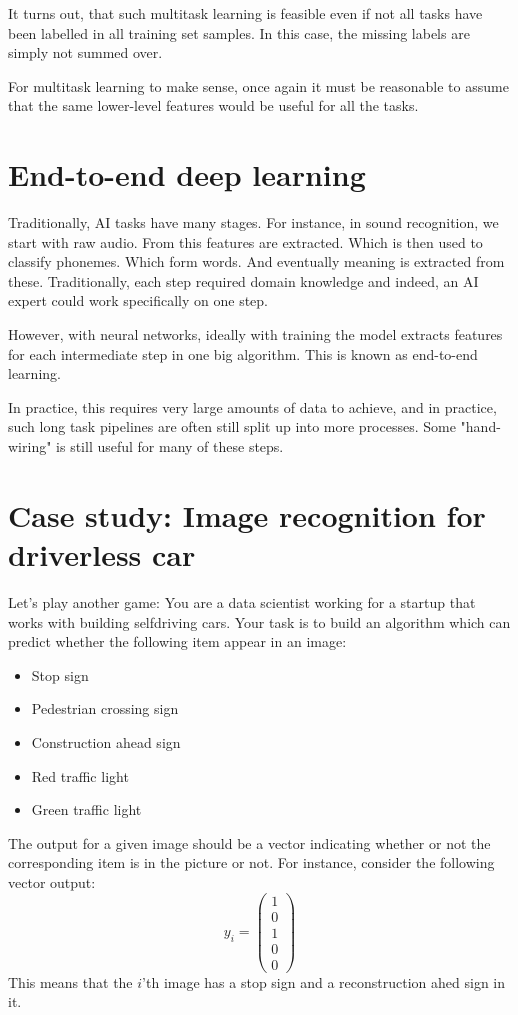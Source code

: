 \documentclass[12pt, a4paper]{article}
\numberwithin{equation}{section}
\begin{document}
It turns out, that such multitask learning is feasible even if not all tasks have been labelled in all training set samples. In this case, the missing labels are simply not summed over.

For multitask learning to make sense, once again it must be reasonable to assume that the same lower-level features would be useful for all the tasks.

\section{End-to-end deep learning}
Traditionally, AI tasks have many stages. For instance, in sound recognition, we start with raw audio. From this features are extracted. Which is then used to classify phonemes. Which form words. And eventually meaning is extracted from these. Traditionally, each step required domain knowledge and indeed, an AI expert could work specifically on one step.

However, with neural networks, ideally with training the model extracts features for each intermediate step in one big algorithm. This is known as end-to-end learning.

In practice, this requires very large amounts of data to achieve, and in practice, such long task pipelines are often still split up into more processes. Some "hand-wiring" is still useful for many of these steps.

\section{Case study: Image recognition for driverless car}
Let's play another game: You are a data scientist working for a startup that works with building selfdriving cars. Your task is to build an algorithm which can predict whether the following item appear in an image:
\begin{itemize}
\item Stop sign
\item Pedestrian crossing sign
\item Construction ahead sign
\item Red traffic light
\item Green traffic light
\end{itemize}
The output for a given image should be a vector indicating whether or not the corresponding item is in the picture or not. For instance, consider the following vector output:
\begin{equation}
y_i=\begin{pmatrix}
1 \\ 0 \\ 1 \\ 0 \\ 0
\end{pmatrix}
\end{equation}
This means that the $i$'th image has a stop sign and a reconstruction ahed sign in it.
\end{document}
